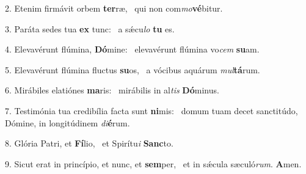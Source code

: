 2. Etenim firmávit orbem \textbf{ter}ræ, \ast\  qui non com\textit{mo}\textbf{vé}bitur.\

3. Paráta sedes tua \textbf{ex} tunc: \ast\  a sǽcu\textit{lo} \textbf{tu} es.\

4. Elevavérunt flúmina, \textbf{Dó}mine: \ast\  elevavérunt flúmina vo\textit{cem} \textbf{su}am.\

5. Elevavérunt flúmina fluctus \textbf{su}os, \ast\  a vócibus aquárum \textit{mul}\textbf{tá}rum.\

6. Mirábiles elatiónes \textbf{ma}ris: \ast\  mirábilis in al\textit{tis} \textbf{Dó}minus.\

7. Testimónia tua credibília facta sunt \textbf{ni}mis: \ast\  domum tuam decet sanctitúdo, Dómine, in longitúdinem \textit{di}\textbf{é}rum.\

8. Glória Patri, et \textbf{Fí}lio, \ast\  et Spirítu\textit{i} \textbf{Sanc}to.\

9. Sicut erat in princípio, et nunc, et \textbf{sem}per, \ast\  et in sǽcula sæculó\textit{rum}. \textbf{A}men.\

